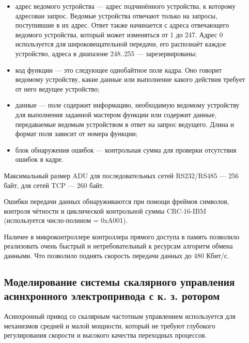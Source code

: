         \begin{itemize}
            \item адрес ведомого устройства — адрес подчинённого устройства, к
                которому адресован запрос. Ведомые устройства отвечают только
                на запросы, поступившие в их адрес. Ответ также начинается с
                адреса отвечающего ведомого устройства, который может
                изменяться от 1 до 247. Адрес 0 используется для
                широковещательной передачи, его распознаёт каждое устройство,
                адреса в диапазоне 248..255 — зарезервированы; 
            \item код функции — это следующее однобайтное поле кадра. Оно
                говорит ведомому устройству, какие данные или выполнение какого
                действия требует от него ведущее устройство; 
            \item данные — поле содержит информацию, необходимую ведомому
                устройству для выполнения заданной мастером функции или
                содержит данные, передаваемые ведомым устройством в ответ на
                запрос ведущего.  Длина и формат поля зависит от номера
                функции;
            \item блок обнаружения ошибок — контрольная сумма для проверки
                отсутствия ошибок в кадре.
        \end{itemize}

        Максимальный размер ADU для последовательных сетей RS232/RS485 — 256
        байт, для сетей TCP — 260 байт. 

        Ошибки передачи данных обнаруживаются при помощи фреймов символов,
        контроля чётности и циклической контрольной суммы CRC-16-IBM
        (используется число-полином = 0xA001). 

        Наличее в микроконтроллере контроллера прямого доступа в память
        позволило реализовать очень быстрый и нетребовательный к ресурсам
        алгоритм обмена данными. Что позволило поднять скорость передачи данных
        до 480 Кбит/с.

    \subsection{Моделирование системы скалярного управления асинхронного
        электропривода с к. з. ротором}

        Асинхронный привод со скалярным частотным управлением используется для
        механизмов средней и малой мощности, который не требуют глубокого
        регулирования скорости и высокого качества переходных процессов.

